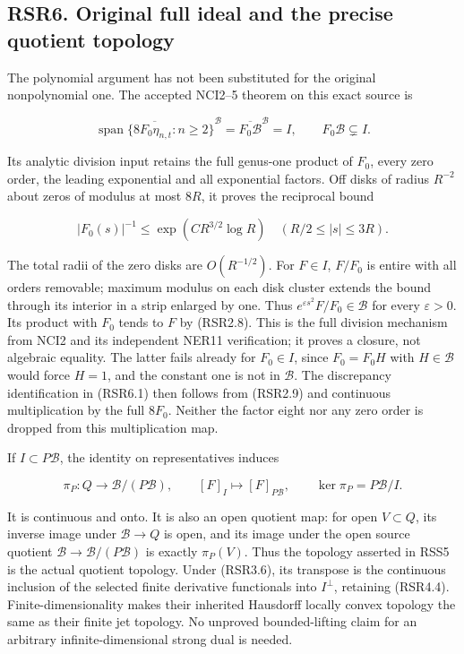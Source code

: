\subsection{RSR6. Original full ideal and the precise quotient
topology}\label{rsr6.-original-full-ideal-and-the-precise-quotient-topology}

The polynomial argument has not been substituted for the original
nonpolynomial one. The accepted NCI2--5 theorem on this exact source is

\[
\overline{\operatorname{span}\{8F_0\eta_{n,t}:n\ge2\}}^{\mathcal B}
=\overline{F_0\mathcal B}^{\mathcal B}=I,
\qquad F_0\mathcal B\subsetneq I.
\tag{RSR6.1}
\]

Its analytic division input retains the full genus-one product of
\(F_0\), every zero order, the leading exponential and all exponential
factors. Off disks of radius \(R^{-2}\) about zeros of modulus at most
\(8R\), it proves the reciprocal bound

\[
|F_0(s)|^{-1}\le\exp(CR^{3/2}\log R)
\quad(R/2\le|s|\le3R).
\tag{RSR6.2}
\]

The total radii of the zero disks are \(O(R^{-1/2})\). For \(F\in I\),
\(F/F_0\) is entire with all orders removable; maximum modulus on each
disk cluster extends the bound through its interior in a strip enlarged
by one. Thus \(e^{\varepsilon s^2}F/F_0\in\mathcal B\) for every
\(\varepsilon>0\). Its product with \(F_0\) tends to \(F\) by (RSR2.8).
This is the full division mechanism from NCI2 and its independent NER11
verification; it proves a closure, not algebraic equality. The latter
fails already for \(F_0\in I\), since \(F_0=F_0H\) with
\(H\in\mathcal B\) would force \(H=1\), and the constant one is not in
\(\mathcal B\). The discrepancy identification in (RSR6.1) then follows
from (RSR2.9) and continuous multiplication by the full \(8F_0\).
Neither the factor eight nor any zero order is dropped from this
multiplication map.

If \(I\subset P\mathcal B\), the identity on representatives induces

\[
\pi_P:Q\longrightarrow\mathcal B/(P\mathcal B),
\qquad[F]_I\longmapsto[F]_{P\mathcal B},\qquad
\ker\pi_P=P\mathcal B/I.
\tag{RSR6.3}
\]

It is continuous and onto. It is also an open quotient map: for open
\(V\subset Q\), its inverse image under \(\mathcal B\to Q\) is open, and
its image under the open source quotient
\(\mathcal B\to\mathcal B/(P\mathcal B)\) is exactly \(\pi_P(V)\). Thus
the topology asserted in RSS5 is the actual quotient topology. Under
(RSR3.6), its transpose is the continuous inclusion of the selected
finite derivative functionals into \(I^\perp\), retaining (RSR4.4).
Finite-dimensionality makes their inherited Hausdorff locally convex
topology the same as their finite jet topology. No unproved
bounded-lifting claim for an arbitrary infinite-dimensional strong dual
is needed.

